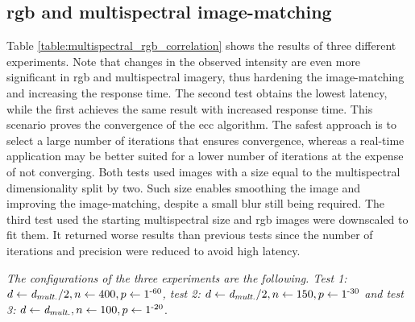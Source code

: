 \renewcommand{\arraystretch}{1}

\subsection{\acrshort{rgb} and multispectral image-matching}

Table \ref{table:multispectral_rgb_correlation} shows the results of three different experiments. Note that changes in the observed intensity are even more significant in \acrshort{rgb} and multispectral imagery, thus hardening the image-matching and increasing the response time. The second test obtains the lowest latency, while the first achieves the same result with increased response time. This scenario proves the convergence of the \acrshort{ecc} algorithm. The safest approach is to select a large number of iterations that ensures convergence, whereas a real-time application may be better suited for a lower number of iterations at the expense of not converging. Both tests used images with a size equal to the multispectral dimensionality split by two. Such size enables smoothing the image and improving the image-matching, despite a small blur still being required. The third test used the starting multispectral size and \acrshort{rgb} images were downscaled to fit them. It returned worse results than previous tests since the number of iterations and precision were reduced to avoid high latency. 

\textit{The configurations of the three experiments are the following. Test 1: $d \gets \textit{d}_{\textit{mult.}} / 2, n \gets 400, p \gets 1\textsuperscript{-60}$, test 2: $d \gets \textit{d}_{\textit{mult.}} / 2, n \gets 150, p \gets 1\textsuperscript{-30}$ and test 3: $d \gets \textit{d}_{\textit{mult.}}, n \gets 100, p \gets 1\textsuperscript{-20}$}.

